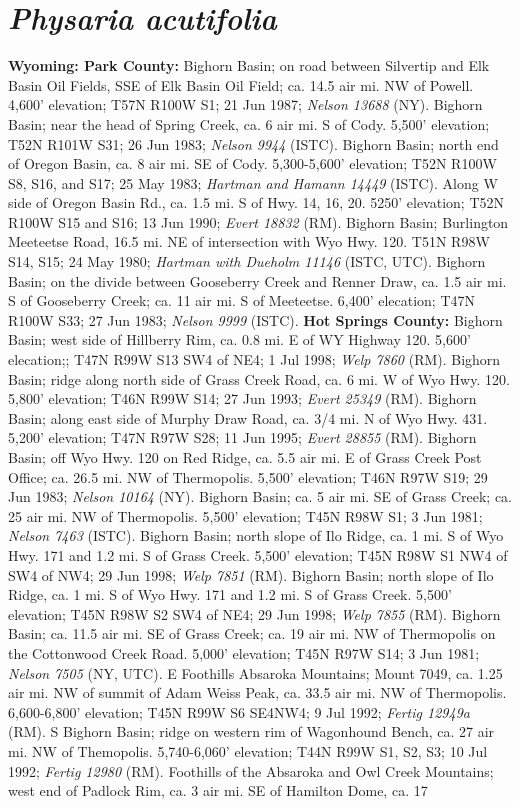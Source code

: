 \section*{\textit{Physaria acutifolia}}

\textbf{Wyoming: Park County:} Bighorn Basin; on road between Silvertip and Elk Basin Oil Fields, SSE of Elk Basin Oil Field; ca. 14.5 air mi. NW of Powell.  	4,600' elevation;	T57N R100W S1; 21 Jun 1987; \textit{Nelson	13688} (NY).  Bighorn Basin; near the head of Spring Creek, ca. 6 air mi. S of Cody. 5,500' elevation; T52N R101W S31; 26 Jun 1983; \textit{Nelson 9944} (ISTC).  Bighorn Basin; north end of Oregon Basin, ca. 8 air mi. SE of Cody. 5,300-5,600' elevation; T52N R100W S8, S16, and S17; 25 May 1983; \textit{Hartman and Hamann 14449} (ISTC).  Along W side of Oregon Basin Rd., ca. 1.5 mi. S of Hwy. 14, 16, 20.	5250' elevation; T52N R100W S15 and S16;	13 Jun 1990; \textit{Evert 18832} (RM).  Bighorn Basin; Burlington Meeteetse Road, 16.5 mi. NE of intersection with Wyo Hwy. 120. T51N R98W S14, S15; 24 May 1980; \textit{Hartman with Dueholm 11146} (ISTC, UTC).  Bighorn Basin; on the divide between Gooseberry Creek and Renner Draw, ca. 1.5 air mi. S of Gooseberry Creek; ca. 11 air mi. S of Meeteetse.	6,400' elecation; T47N R100W S33; 27 Jun 1983; \textit{Nelson 9999}	(ISTC).  \textbf{Hot Springs County:} Bighorn Basin; west side of Hillberry Rim, ca. 0.8 mi. E of WY Highway 120. 5,600' elecation;; T47N R99W S13 SW4 of NE4; 1 Jul 1998; \textit{Welp 7860} (RM).  Bighorn Basin; ridge along north side of Grass Creek Road, ca. 6 mi. W of Wyo Hwy. 120. 5,800' elevation; T46N R99W S14; 27 Jun 1993; \textit{Evert 25349} (RM).  Bighorn Basin; along east side of Murphy Draw Road, ca. 3/4 mi. N of Wyo Hwy. 431. 5,200' elevation; T47N R97W S28; 11 Jun 1995; \textit{Evert 28855} (RM).  Bighorn Basin; off Wyo Hwy. 120 on Red Ridge, ca. 5.5 air mi. E of Grass Creek Post Office; ca. 26.5 mi. NW of Thermopolis. 5,500' elevation; T46N R97W S19; 29 Jun 1983; \textit{Nelson 10164} (NY).  Bighorn Basin; ca. 5 air mi. SE of Grass Creek; ca. 25 air mi. NW of Thermopolis. 5,500' elevation; T45N R98W S1; 3 Jun 1981; \textit{Nelson 7463} (ISTC).  Bighorn Basin; north slope of Ilo Ridge, ca. 1 mi. S of Wyo Hwy. 171 and 1.2 mi. S of Grass Creek.	5,500' elevation; T45N R98W S1 NW4 of SW4 of NW4; 29 Jun 1998; \textit{Welp 7851} (RM).  Bighorn Basin; north slope of Ilo Ridge, ca. 1 mi. S of Wyo Hwy. 171 and 1.2 mi. S of Grass Creek.	5,500' elevation; T45N R98W S2 SW4 of NE4; 29 Jun 1998; \textit{Welp 7855} (RM).  Bighorn Basin; ca. 11.5 air mi. SE of Grass Creek; ca. 19 air mi. NW of Thermopolis on the Cottonwood Creek Road. 5,000' elevation; T45N R97W S14; 3 Jun 1981; \textit{Nelson 7505} (NY, UTC).  E Foothills Absaroka Mountains; Mount 7049, ca. 1.25 air mi. NW of summit of Adam Weiss Peak, ca. 33.5 air mi. NW of Thermopolis. 6,600-6,800' elevation; T45N R99W S6	SE4NW4; 9 Jul 1992; \textit{Fertig 12949a} (RM).  S Bighorn Basin; ridge on western rim of Wagonhound Bench, ca. 27 air mi. NW of Themopolis. 5,740-6,060' elevation; T44N R99W S1, S2, S3; 10 Jul 1992; \textit{Fertig 12980} (RM).  Foothills of the Absaroka and Owl Creek Mountains; west end of Padlock Rim, ca. 3 air mi. SE of Hamilton Dome, ca. 17 